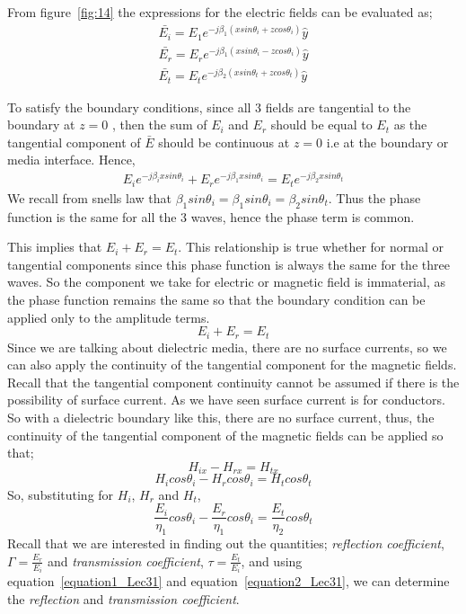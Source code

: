 From figure~\ref{fig:14} the expressions for the electric fields can be evaluated as;
\begin{align*}
\bar{E_{i}} = E_{1} e^{-j\beta_{1} (x sin\theta_{i} + z cos\theta_{i})} \hat{y}\\
\bar{E_{r}} = E_{r} e^{-j\beta_{1} (x sin\theta_{i} - z cos\theta_{i})} \hat{y}\\
\bar{E_{t}} = E_{t} e^{-j\beta_{2} (x sin\theta_{t} + z cos\theta_{t})} \hat{y}
\end{align*}

To satisfy the boundary conditions, since all 3 fields are tangential to the boundary at $z=0$ , then the sum of $E_i$ and $E_r$ should be equal to $E_{t}$ as the tangential component of $\bar{E}$ should be continuous at $z=0$ i.e at the boundary or media interface.
Hence,
\begin{align*}
E_{i} e^{-j \beta_{i} x sin\theta_{i}} + E_{r} e^{-j \beta_{1} x sin\theta_{i}} = E_{t} e^{-j \beta_{2} x sin\theta_{t}}
\end{align*}
We recall from snells law that $\beta_{1} sin\theta_{i} = \beta_{1} sin\theta_{i} = \beta_{2} sin\theta_{t}$. Thus the phase function is the same for all the 3 waves, hence the phase term is common.

This implies that $ E_{i} + E_{r} = E_{t}$. This relationship is true whether for normal or tangential components since this phase function is always the same for the three waves. So the component we take for electric or magnetic field is immaterial, as the phase function remains the same so that the boundary condition can be applied only to the amplitude terms. 
\begin{equation}
E_{i} + E_{r} = E_{t}
\label{equation1_Lec31}
\end{equation}
Since we are talking about dielectric media, there are no surface currents, so we can also apply the continuity of the tangential component for the magnetic fields. Recall that the tangential component continuity cannot be assumed if there is the possibility of surface current. As we have seen surface current is for conductors. So with a dielectric boundary like this, there are no surface current, thus, the continuity of the tangential component of the magnetic fields can be applied so that; 
\begin{equation*}
	H_{ix} - H_{rx} = H_{tx}
\end{equation*}
\begin{equation*}
		H_{i} cos\theta_{i} - H_{r} cos\theta_{i} = H_{t} cos\theta_{t}
\end{equation*}
	So, substituting for $H_{i}$, $H_{r}$ and $H_{t}$,
\begin{equation}
\frac{E_{i}}{\eta_{1}} cos\theta_{i} - \frac{E_{r}}{\eta_{1}} cos\theta_{i} = \frac{E_{t}}{\eta_{2}} cos\theta_{t}
\label{equation2_Lec31}
\end{equation}
Recall that we are interested in finding out the quantities; \emph{reflection coefficient}, $\Gamma = \frac{E_{r}}{E_{i}}$ and \emph{transmission coefficient}, $ \tau = \frac{E_{t}}{E_{i}}$, and using equation~\ref{equation1_Lec31} and equation~\ref{equation2_Lec31}, we can determine the \emph{reflection} and \emph{transmission coefficient}.

